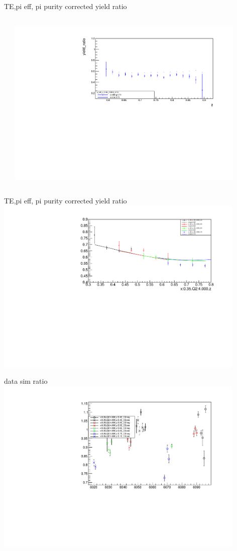\begin{frame}{TE,pi eff, pi purity corrected yield ratio}
\begin{columns}
\begin{column}[T]{0.5\textwidth}
\end{column}
\begin{column}[T]{0.5\textwidth}
\includegraphics[width = 0.9\textwidth]{results/yield/statistics_corr/x_Q2_z_35_4000_70_ratio.pdf}
\end{column}
\end{columns}
\end{frame}
\begin{frame}{TE,pi eff, pi purity corrected yield ratio}
\includegraphics[width = 0.9\textwidth]{results/yield/statistics_corr/x_Q2_35_4000_ratio.pdf}
\end{frame}
\begin{frame}{data sim ratio}
    \includegraphics[width = 0.9\textwidth]{results/yield/run_info_pdf/x_Q2_35_4000_data_simc_ratio.pdf}
\end{frame}
